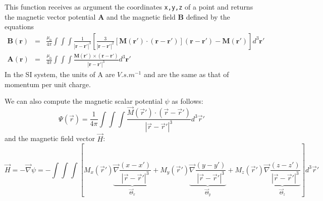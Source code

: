
This function receives as argument the coordinates {\tt x,y,z} of a point and 
returns the magnetic vector potential ${\bm A}$ and the magnetic field ${\bm B}$
defined by the equations
\begin{eqnarray}
{\bm B}({\bm r}) &=& \frac{\mu_0}{4\pi} \int\int\int \frac{1}{|{\bm r}-{\bm r}'|^3}
\left[
\frac{3}{|{\bm r}-{\bm r}'|^2} [{\bm M}({\bm r}')\cdot({\bm r}-{\bm r}')]({\bm r}-{\bm r}') - {\bm M}({\bm r}')
\right]
d^3{\bm r}' \\
{\bm A}({\bm r}) &=& 
\frac{\mu_0}{4\pi} \int\int\int \frac{{\bm M}({\bm r}') \times ({\bm r}-{\bm r}')}{|{\bm r}-{\bm r}'|^3}
d^3{\bm r}'
\end{eqnarray}
In the SI system, the units of A are $V.s.m^{-1}$ 
and are the same as that of momentum per unit charge.

We can also compute the magnetic scalar potential $\psi$ as follows:
\[
\Psi (\vec r)= \frac{1}{4\pi} \int\int\int \frac{{\vec M}({\vec r}') \cdot ({\vec r}-{\vec r}')}{|{\vec r}-{\vec r}'|^3} 
d^3{\vec r}'
\]
and the magnetic field vector $\vec H$:
\[
\vec H = -\vec\nabla \psi = 
- \int\int\int 
\left[
 M_x({\vec r}') \underbrace{\vec\nabla \frac{ (x-x')}{|{\vec r}-{\vec r}'|^3}}_{\vec\Theta_x} +   
 M_y({\vec r}') \underbrace{\vec\nabla \frac{ (y-y')}{|{\vec r}-{\vec r}'|^3}}_{\vec\Theta_y} +   
 M_z({\vec r}') \underbrace{\vec\nabla \frac{ (z-z')}{|{\vec r}-{\vec r}'|^3}}_{\vec\Theta_z}    
\right] 
d^3{\vec r}'
\]
